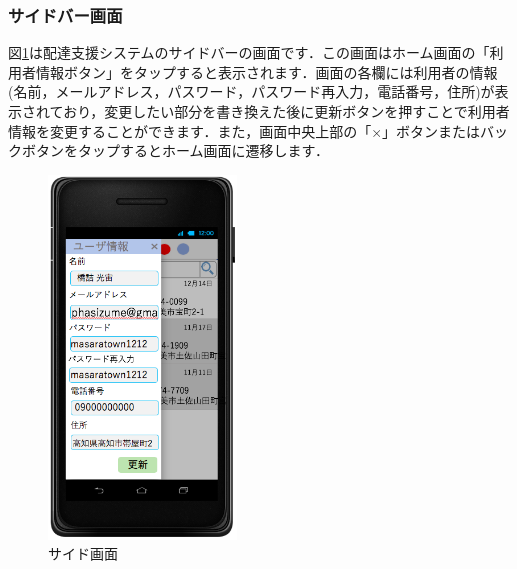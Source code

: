 \documentclass[a4j,titlepage]{jarticle}
\begin{document}
\subsubsection{サイドバー画面}
図\ref{fig:user_side}は配達支援システムのサイドバーの画面です．この画面はホーム画面の「利用者情報ボタン」をタップすると表示されます．画面の各欄には利用者の情報(名前，メールアドレス，パスワード，パスワード再入力，電話番号，住所)が表示されており，変更したい部分を書き換えた後に更新ボタンを押すことで利用者情報を変更することができます．また，画面中央上部の「×」ボタンまたはバックボタンをタップするとホーム画面に遷移します．

\begin{figure}[H]
 \begin{center}
  \includegraphics[width=50mm]{user_side.png}
	\caption{サイド画面}
	\label{fig:user_side}
 \end{center}

\end{figure}
\newpage
\end{document}
